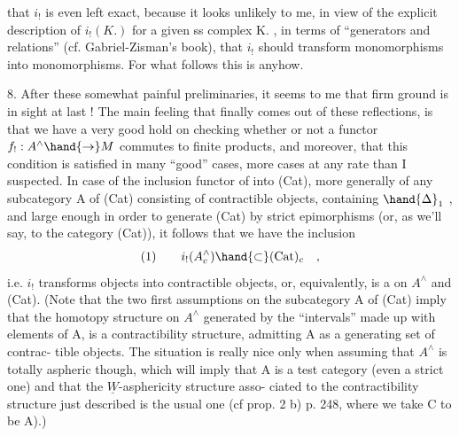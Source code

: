 that $i_!$ is even left exact,  because it looks unlikely to me, in view
of the explicit description of $i_!(K.)$ for a given ss complex K. , in
terms of ``generators and relations'' (cf. Gabriel-Zisman's book),  that
$i_!$ should transform monomorphisms into monomorphisms.  For what follows
this is  anyhow.

8.  After these somewhat painful preliminaries,  it seems to me that
firm ground is in sight at last !  The main feeling that finally comes
out of these reflections,  is that we have a very good hold on checking
whether or not a functor $f_! : A^\wedge \hand{\to} M$ commutes to finite products,  and
moreover,  that this condition is satisfied in many ``good'' cases,   
more cases at any rate than I suspected.  In case of the inclusion
functor of \hand{$\Delta$} into (Cat),  more generally of any  subcategory  A
of (Cat) consisting of contractible objects,  containing $\hand{\Delta}_1$ ,  and
large enough in order to generate (Cat) by strict epimorphisms (or, as
we'll say,  to \hand{\uline{\textcolor{black}{generate strictly}}} the category (Cat)),  it follows that
we have the inclusion
\[ (1) \qquad i_!(A^\wedge_c) \hand{\subset} (\mathrm{Cat})_c \quad , \]
i.e.  $i_!$ transforms \hand{\uline{\textcolor{black}{contractible}}} objects into contractible objects,
or,  equivalently,  is a \hand{\uline{\textcolor{black}{morphism for the}}}  \hand{\uline{\textcolor{black}{homotopy struc-}}}%
\hand{\uline{\textcolor{black}{tures}}} on $A^\wedge$ and (Cat).  (Note that the two first assumptions on the
subcategory A of (Cat)  imply that the  homotopy structure
on $A^\wedge$ generated by the ``intervals'' made up with elements of A,  is a
contractibility structure,  admitting A as a generating set of contrac-%
tible objects.  The situation is really nice only when assuming that $A^\wedge$
is totally aspheric though,  which will imply that A\xout{$^\wedge$} is a  test
category (even a strict one) and that the $\underline{W}$-asphericity structure  asso-%
ciated to the contractibility structure just described is the usual one
(cf prop. 2 b)  p. 248,  where we take C to be A).)

